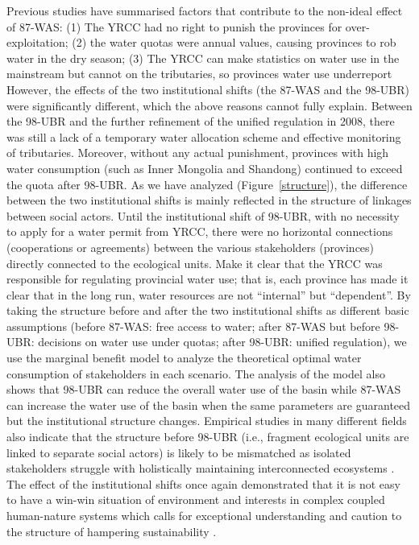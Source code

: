 Previous studies have summarised factors that contribute to the non-ideal effect of 87-WAS: (1) The YRCC had no right to punish the provinces for over-exploitation; (2) the water quotas were annual values, causing provinces to rob water in the dry season; (3) The YRCC can make statistics on water use in the mainstream but cannot on the tributaries, so provinces water use underreport %
However, the effects of the two institutional shifts (the 87-WAS and the 98-UBR) were significantly different, which the above reasons cannot fully explain.
Between the 98-UBR and the further refinement of the unified regulation in 2008, there was still a lack of a temporary water allocation scheme and effective monitoring of tributaries.
Moreover, without any actual punishment, provinces with high water consumption (such as Inner Mongolia and Shandong) continued to exceed the quota after 98-UBR.
As we have analyzed (Figure~\ref{structure}), the difference between the two institutional shifts is mainly reflected in the structure of linkages between social actors.
Until the institutional shift of 98-UBR, with no necessity to apply for a water permit from YRCC, there were no horizontal connections (cooperations or agreements) between the various stakeholders (provinces) directly connected to the ecological units.
Make it clear that the YRCC was responsible for regulating provincial water use; that is, each province has made it clear that in the long run, water resources are not ``internal'' but ``dependent''.
By taking the structure before and after the two institutional shifts as different basic assumptions (before 87-WAS: free access to water; after 87-WAS but before 98-UBR: decisions on water use under quotas; after 98-UBR: unified regulation), we use the marginal benefit model to analyze the theoretical optimal water consumption of stakeholders in each scenario.
The analysis of the model also shows that 98-UBR can reduce the overall water use of the basin while 87-WAS can increase the water use of the basin when the same parameters are guaranteed but the institutional structure changes.
Empirical studies in many different fields also indicate that the structure before 98-UBR (i.e., fragment ecological units are linked to separate social actors) is likely to be mismatched as isolated stakeholders struggle with holistically maintaining interconnected ecosystems
\cite{sayles2017,sayles2019,cai2016,bergsten2019}.
The effect of the institutional shifts once again demonstrated that it is not easy to have a win-win situation of environment and interests in complex coupled human-nature systems \cite{hegwood2022} which calls for exceptional understanding and caution to the structure of hampering sustainability \cite{bergsten2019, sayles2019}.
